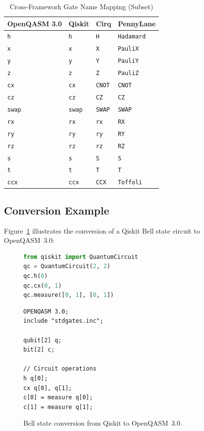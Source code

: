 \documentclass[conference]{IEEEtran}
\begin{document}
\begin{table}[t]
\centering
\caption{Cross-Framework Gate Name Mapping (Subset)}
\label{tab:gatemapping}
\begin{tabular}{@{}llll@{}}
\toprule
\textbf{OpenQASM 3.0} & \textbf{Qiskit} & \textbf{Cirq} & \textbf{PennyLane} \\
\midrule
\texttt{h}    & \texttt{h}    & \texttt{H}    & \texttt{Hadamard} \\
\texttt{x}    & \texttt{x}    & \texttt{X}    & \texttt{PauliX} \\
\texttt{y}    & \texttt{y}    & \texttt{Y}    & \texttt{PauliY} \\
\texttt{z}    & \texttt{z}    & \texttt{Z}    & \texttt{PauliZ} \\
\texttt{cx}   & \texttt{cx}   & \texttt{CNOT} & \texttt{CNOT} \\
\texttt{cz}   & \texttt{cz}   & \texttt{CZ}   & \texttt{CZ} \\
\texttt{swap} & \texttt{swap} & \texttt{SWAP} & \texttt{SWAP} \\
\texttt{rx}   & \texttt{rx}   & \texttt{rx}   & \texttt{RX} \\
\texttt{ry}   & \texttt{ry}   & \texttt{ry}   & \texttt{RY} \\
\texttt{rz}   & \texttt{rz}   & \texttt{rz}   & \texttt{RZ} \\
\texttt{s}    & \texttt{s}    & \texttt{S}    & \texttt{S} \\
\texttt{t}    & \texttt{t}    & \texttt{T}    & \texttt{T} \\
\texttt{ccx}  & \texttt{ccx}  & \texttt{CCX}  & \texttt{Toffoli} \\
\bottomrule
\end{tabular}
\end{table}

\subsection{Conversion Example}

Figure~\ref{fig:example} illustrates the conversion of a Qiskit Bell state circuit to OpenQASM~3.0:

\begin{figure}[t]
\begin{lstlisting}[language=Python, caption={Input: Qiskit Bell State}]
from qiskit import QuantumCircuit
qc = QuantumCircuit(2, 2)
qc.h(0)
qc.cx(0, 1)
qc.measure([0, 1], [0, 1])
\end{lstlisting}

\begin{lstlisting}[language=openqasm, caption={Output: OpenQASM 3.0}]
OPENQASM 3.0;
include "stdgates.inc";

qubit[2] q;
bit[2] c;

// Circuit operations
h q[0];
cx q[0], q[1];
c[0] = measure q[0];
c[1] = measure q[1];
\end{lstlisting}
\caption{Bell state conversion from Qiskit to OpenQASM~3.0.}
\label{fig:example}
\end{figure}
\end{document}
